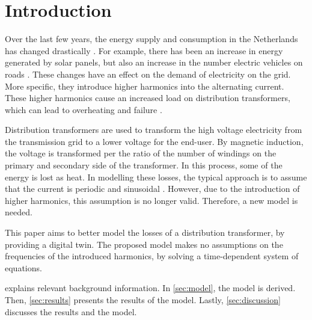 \chapter{Introduction}

Over the last few years, the energy supply and consumption in the Netherlands has changed drastically \citehere. For example, there has been an increase in energy generated by solar panels, but also an increase in the number electric vehicles on roads \citehere. These changes have an effect on the demand of electricity on the grid. More specific, they introduce higher harmonics into the alternating current. These higher harmonics cause an increased load on distribution transformers, which can lead to overheating and failure \citehere.

Distribution transformers are used to transform the high voltage electricity from the transmission grid to a lower voltage for the end-user. By magnetic induction, the voltage is transformed per the ratio of the number of windings on the primary and secondary side of the transformer. In this process, some of the energy is lost as heat. In modelling these losses, the typical approach is to assume that the current is periodic and sinusoidal \citehere. However, due to the introduction of higher harmonics, this assumption is no longer valid. Therefore, a new model is needed.

This paper aims to better model the losses of a distribution transformer, by providing a digital twin. The proposed model makes no assumptions on the frequencies of the introduced harmonics, by solving a time-dependent system of equations.

 explains relevant background information. In \cref{sec:model}, the model is derived. Then, \cref{sec:results} presents the results of the model. Lastly, \cref{sec:discussion} discusses the results and the model.

